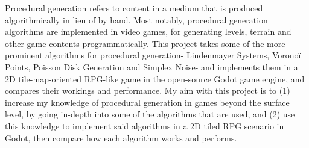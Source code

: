 Procedural generation refers to content in a medium that is produced algorithmically in lieu of by hand. Most notably, procedural generation algorithms are implemented in video games, for generating levels, terrain and other game contents programmatically. This project takes some of the more prominent algorithms for procedural generation- Lindenmayer Systems, Voronoï Points, Poisson Disk Generation and Simplex Noise- and implements them in a 2D tile-map-oriented RPG-like game in the open-source Godot game engine, and compares their workings and performance. My aim with this project is to (1) increase my knowledge of procedural generation in games beyond the surface level, by going in-depth into some of the algorithms that are used, and (2) use this knowledge to implement said algorithms in a 2D tiled RPG scenario in Godot, then compare how each algorithm works and performs.